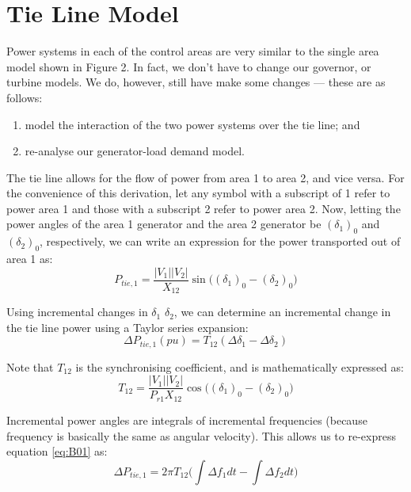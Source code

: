\section{Tie Line Model}
Power systems in each of the control areas are very similar to the single area model shown in Figure 2. In fact, we don't have to change our governor, or turbine models. We do, however, still have make some changes --- these are as follows:
\begin{enumerate}
	\item model the interaction of the two power systems over the tie line; and
	\item re-analyse our generator-load demand model.
\end{enumerate}

The tie line allows for the flow of power from area 1 to area 2, and vice versa. For the convenience of this derivation, let any symbol with a subscript of 1 refer to power area 1 and those with a subscript 2 refer to power area 2. Now, letting the power angles of the area 1 generator and the area 2 generator be $(\delta_1)_0$ and $(\delta_2)_0$, respectively, we can write an expression for the power transported out of area 1 as:
\begin{equation}
	P_{tie, 1} = \frac{|V_1||V_2|}{X_{12}} \sin \big( (\delta_1)_0 - (\delta_2)_0 \big)
\end{equation}

Using incremental changes in $\delta_1$ $\delta_2$, we can determine an incremental change in the tie line power using a Taylor series expansion:
\begin{equation}
	\Delta P_{tie, 1}(pu) = T_{12} (\Delta \delta_1 - \Delta \delta_2) \label{eq:B01}
\end{equation}

Note that $T_{12}$ is the synchronising coefficient, and is mathematically expressed as:
\begin{equation}
	T_{12} = \frac{|V_1||V_2|}{P_{r1} X_{12}} \cos \big( (\delta_1)_0 - (\delta_2)_0 \big)
\end{equation}

Incremental power angles are integrals of incremental frequencies (because frequency is basically the same as angular velocity). This allows us to re-express equation \ref{eq:B01} as:
\begin{equation}
	\Delta P_{tie, 1} = 2 \pi T_{12} \bigg( \int \Delta f_1 dt - \int \Delta f_2 dt \bigg) \label{eq:B02}
\end{equation}

